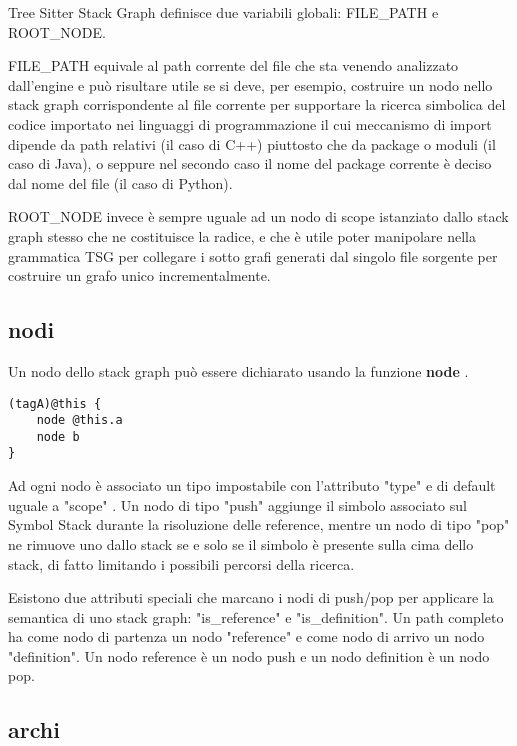 Tree Sitter Stack Graph definisce due variabili globali: FILE\_PATH e ROOT\_NODE.

FILE\_PATH equivale al path corrente del file che sta venendo analizzato dall'engine e pu\`o risultare utile se si deve, per esempio, costruire un nodo nello stack graph corrispondente al file corrente per supportare la ricerca simbolica del codice importato nei linguaggi di programmazione il cui meccanismo di import dipende da path relativi (il caso di C++) piuttosto che da package o moduli (il caso di Java), o seppure nel secondo caso il nome del package corrente \`e deciso dal nome del file (il caso di Python).

ROOT\_NODE invece \`e sempre uguale ad un nodo di scope istanziato dallo stack graph stesso che ne costituisce la radice, e che \`e utile poter manipolare nella grammatica TSG per collegare i sotto grafi generati dal singolo file sorgente per costruire un grafo unico incrementalmente.

\subsection{nodi}

Un nodo dello stack graph pu\`o essere dichiarato usando la funzione \textbf{node} \cite{TreeSitterGraphReferenceGraphNodes}.

\begin{lstlisting}
(tagA)@this {
    node @this.a
    node b
}
\end{lstlisting}

Ad ogni nodo \`e associato un tipo impostabile con l'attributo "type" e di default uguale a "scope" \cite{TreeSitterStackGraphNodes}.
Un nodo di tipo "push" aggiunge il simbolo associato sul Symbol Stack durante la risoluzione delle reference, mentre un nodo di tipo "pop" ne rimuove uno dallo stack se e solo se il simbolo \`e presente sulla cima dello stack, di fatto limitando i possibili percorsi della ricerca.

Esistono due attributi speciali che marcano i nodi di push/pop per applicare la semantica di uno stack graph: "is\_reference" e "is\_definition".
Un path completo ha come nodo di partenza un nodo "reference" e come nodo di arrivo un nodo "definition".
Un nodo reference \`e un nodo push e un nodo definition \`e un nodo pop.

\subsection{archi}


